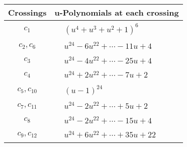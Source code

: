 \documentclass[1p]{elsarticle_modified}
\theoremstyle{definition}
\begin{document}
\begin{tabular}{m{50pt}|m{274pt}}
Crossings & \hspace{64pt}u-Polynomials at each crossing \\
\hline $$\begin{aligned}c_{1}\end{aligned}$$&$\begin{aligned}
&(u^4+u^3+u^2+1)^6
\end{aligned}$\\
\hline $$\begin{aligned}c_{2},c_{6}\end{aligned}$$&$\begin{aligned}
&u^{24}-6 u^{22}+\cdots-11 u+4
\end{aligned}$\\
\hline $$\begin{aligned}c_{3}\end{aligned}$$&$\begin{aligned}
&u^{24}-4 u^{22}+\cdots-25 u+4
\end{aligned}$\\
\hline $$\begin{aligned}c_{4}\end{aligned}$$&$\begin{aligned}
&u^{24}+2 u^{22}+\cdots-7 u+2
\end{aligned}$\\
\hline $$\begin{aligned}c_{5},c_{10}\end{aligned}$$&$\begin{aligned}
&(u-1)^{24}
\end{aligned}$\\
\hline $$\begin{aligned}c_{7},c_{11}\end{aligned}$$&$\begin{aligned}
&u^{24}-2 u^{22}+\cdots+5 u+2
\end{aligned}$\\
\hline $$\begin{aligned}c_{8}\end{aligned}$$&$\begin{aligned}
&u^{24}-2 u^{22}+\cdots-15 u+4
\end{aligned}$\\
\hline $$\begin{aligned}c_{9},c_{12}\end{aligned}$$&$\begin{aligned}
&u^{24}+6 u^{22}+\cdots+35 u+22
\end{aligned}$\\
\hline
\end{tabular}\\~\\
\end{document}
